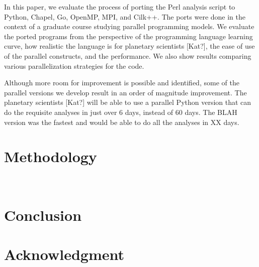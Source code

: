 \documentclass[conference]{IEEEtran}
\begin{document}
In this paper, we evaluate the process of porting the Perl analysis script
to Python, Chapel, Go, OpenMP, MPI, and Cilk++.
The ports were done in the context of a graduate course studying
parallel programming models.  We evaluate the ported programs
from the perspective of the programming language learning curve,
how realistic the language is for planetary scientists [Kat?],
the ease of use of the parallel constructs, and the performance.
We also show results comparing various parallelization strategies
for the code.

Although more room for improvement is possible and 
identified, some of the parallel versions we develop result in
an order of magnitude improvement.  The planetary scientists [Kat?]
will be able to use a parallel Python version that can do the
requisite analyses in just over 6 days, instead of 60 days.
The BLAH version was the fastest and would be able to do all
the analyses in XX days.



\section{Methodology}

~\cite{ChapelOverviewJan13}


\section{Conclusion}




\section*{Acknowledgment}




\end{document}
